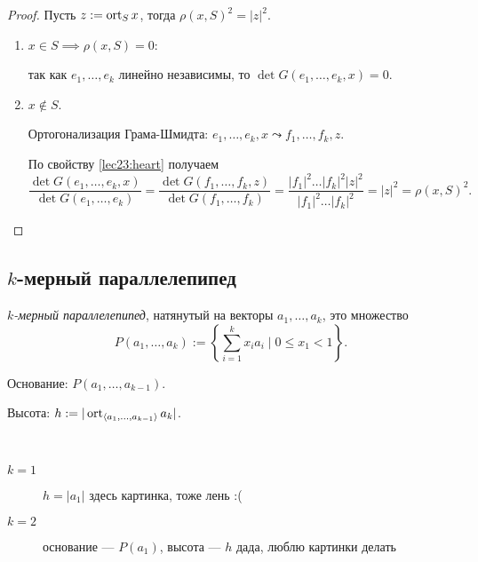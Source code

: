 \begin{proof}
    Пусть $z := \operatorname{\mathop{\mathrm{ort}}}_S x$, тогда $\rho(x, S)^2 = |z|^2$.

    \begin{enumerate}
    \item $x \in S \implies \rho(x, S) = 0$:

        так как $e_1, \dots, e_k$ линейно независимы, то $\det G(e_1, \dots, e_k, x) = 0$.

    \item $x \not\in S$.

        Ортогонализация Грама-Шмидта: $e_1, \dots, e_k, x \leadsto f_1, \dots, f_k, z$.

        По свойству \ref{lec23:heart} получаем
        \begin{equation*}
            \dfrac{\det G(e_1, \dots, e_k, x)}{\det G(e_1, \dots, e_k)} = \dfrac{\det G(f_1, \dots, f_k, z)}{\det G(f_1, \dots, f_k)} = \frac{|f_1|^2 \dots |f_k|^2 |z|^2}{|f_1|^2 \dots |f_k|^2} = |z|^2 = \rho(x, S)^2
        .\end{equation*}
    \end{enumerate}
\end{proof}


\subsection{$k$-мерный параллелепипед}

\begin{definition}
    \textit{$k$-мерный параллелепипед}, натянутый на векторы $a_1, \dots, a_k$, это множество
    \begin{equation*}
        P(a_1, \dots, a_k) := \left\{ \sum_{i = 1}^{k} x_i a_i \mid 0 \leq x_1 < 1 \right\}
    .\end{equation*}

    Основание: $P(a_1, \dots, a_{k - 1})$.

    Высота: $h := |\operatorname{\mathop{\mathrm{ort}}}_{\left< a_1, \dots, a_{k - 1} \right>} a_k|$.
\end{definition}

\begin{example}~
    \begin{description}
    \item[$k = 1$] $h = |a_1|$ {\tiny здесь картинка, тоже лень :(}
    \item[$k = 2$] основание --- $P(a_1)$, высота --- $h$ {\tiny дада, люблю картинки делать}
    \end{description}
\end{example}


